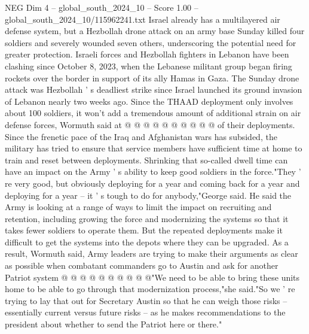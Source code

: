 \begin{textsample}{NEG Dim 4 – global\_south\_2024\_10 – Score 1.00 – global\_south\_2024\_10/115962241.txt}
Israel already has a multilayered air defense system, but a Hezbollah drone attack on an army base Sunday killed four soldiers and severely wounded seven others, underscoring the potential need for greater protection.
Israeli forces and Hezbollah fighters in Lebanon have been clashing since October 8, 2023, when the Lebanese militant group began firing rockets over the border in support of its ally Hamas in Gaza.
The Sunday drone attack was Hezbollah ' s deadliest strike since Israel launched its ground invasion of Lebanon nearly two weeks ago.
Since the THAAD deployment only involves about 100 soldiers, it won't add a tremendous amount of additional strain on air defense forces, Wormuth said at @ @ @ @ @ @ @ @ @ @ of their deployments.
Since the frenetic pace of the Iraq and Afghanistan wars has subsided, the military has tried to ensure that service members have sufficient time at home to train and reset between deployments.
Shrinking that so-called dwell time can have an impact on the Army ' s ability to keep good soldiers in the force."They ' re very good, but obviously deploying for a year and coming back for a year and deploying for a year -- it ' s tough to do for anybody,"George said.
He said the Army is looking at a range of ways to limit the impact on recruiting and retention, including growing the force and modernizing the systems so that it takes fewer soldiers to operate them.
But the repeated deployments make it difficult to get the systems into the depots where they can be upgraded.
As a result, Wormuth said, Army leaders are trying to make their arguments as clear as possible when combatant commanders go to Austin and ask for another Patriot system @ @ @ @ @ @ @ @ @ @"We need to be able to bring these units home to be able to go through that modernization process,"she said."So we ' re trying to lay that out for Secretary Austin so that he can weigh those risks -- essentially current versus future risks -- as he makes recommendations to the president about whether to send the Patriot here or there."

\end{textsample}

